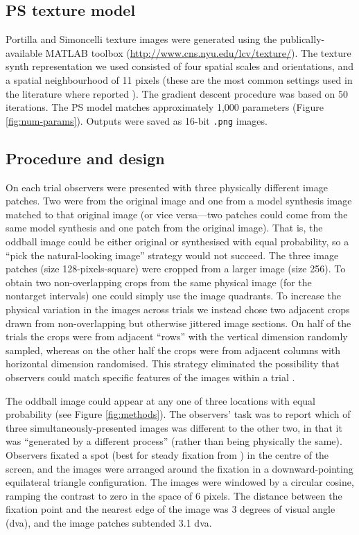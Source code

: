 \documentclass[doc, 11pt,a4paper,natbib]{apa6}\usepackage[]{graphicx}\usepackage[]{color}
\begin{document}
\subsection{PS texture model}

Portilla and Simoncelli \citep[PS][]{portilla_parametric_2000} texture images were generated using the publically-available MATLAB toolbox (\url{http://www.cns.nyu.edu/lcv/texture/}). 
The texture synth representation we used consisted of four spatial scales and orientations, and a spatial neighbourhood of 11 pixels (these are the most common settings used in the literature where reported \citep[e.g.][]{freeman_metamers_2011, balas_summary-statistic_2009}).
The gradient descent procedure was based on 50 iterations.
The PS model matches approximately 1,000 parameters (Figure \ref{fig:num-params}).
Outputs were saved as 16-bit \texttt{.png} images.

\subsection{Procedure and design}

On each trial observers were presented with three physically different image patches.
Two were from the original image and one from a model synthesis image matched to that original image (or vice versa---two patches could come from the same model synthesis and one patch from the original image).
That is, the oddball image could be either original or synthesised with equal probability, so a ``pick the natural-looking image'' strategy would not succeed.
The three image patches (size 128-pixels-square) were cropped from a larger image (size 256).
To obtain two non-overlapping crops from the same physical image (for the nontarget intervals) one could simply use the image quadrants. 
To increase the physical variation in the images across trials we instead chose two adjacent crops drawn from non-overlapping but otherwise jittered image sections.
On half of the trials the crops were from adjacent ``rows'' with the vertical dimension randomly sampled, whereas on the other half the crops were from adjacent columns with horizontal dimension randomised.
This strategy eliminated the possibility that observers could match specific features of the images within a trial \citep[as in][]{balas_texture_2006}.

The oddball image could appear at any one of three locations with equal probability (see Figure \ref{fig:methods}).
The observers' task was to report which of three simultaneously-presented images was different to the other two, in that it was ``generated by a different process'' (rather than being physically the same).
Observers fixated a spot (best for steady fixation from \citet{thaler_what_2013}) in the centre of the screen, and the images were arranged around the fixation in a downward-pointing equilateral triangle configuration.
The images were windowed by a circular cosine, ramping the contrast to zero in the space of 6 pixels.
The distance between the fixation point and the nearest edge of the image was 3 degrees of visual angle (dva), and the image patches subtended 3.1 dva.
\end{document}
